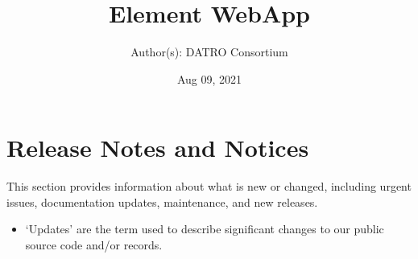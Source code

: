 \documentclass[letterpaper,10pt,openany,oneside,english]{sphinxmanual}
\title{Element WebApp}
\date{Aug 09, 2021}
\author{Author(s): DATRO Consortium}
\begin{document}
\pagestyle{empty}
\sphinxmaketitle
\pagestyle{plain}
\sphinxtableofcontents
\pagestyle{normal}
\label{\detokenize{index::doc}}



\chapter{Release Notes and Notices}
\label{\detokenize{releasenotes:release-notes-and-notices}}\label{\detokenize{releasenotes::doc}}
\sphinxAtStartPar
This section provides information about what is new or changed, including urgent issues, documentation updates, maintenance, and new releases.
\begin{itemize}
\item {} 
\sphinxAtStartPar
‘Updates’ are the term used to describe significant changes to our public source code and/or records.

\end{itemize}
\end{document}
